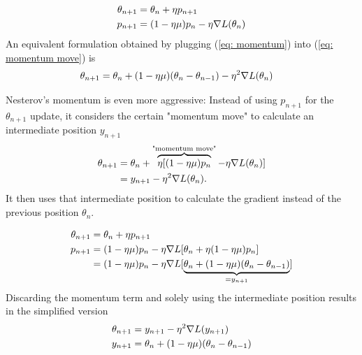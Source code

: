 \begin{definition}
	\begin{subequations}
	\begin{align}
		\theta_{n+1} &= \theta_n + \eta p_{n+1} \label{eq: momentum move}\\
		p_{n+1} &= (1-\eta\mu)p_n - \eta\nabla L(\theta_n)
		\label{eq: momentum}
	\end{align}
	\end{subequations}
	An equivalent formulation obtained by plugging (\ref{eq: momentum}) into
	(\ref{eq: momentum move}) is
	\begin{align}
		\theta_{n+1}
		&= \theta_n + (1-\eta\mu)(\theta_n - \theta_{n-1}) - \eta^2\nabla L(\theta_n)
	\end{align}
\end{definition}
%
Nesterov's momentum is even more aggressive: Instead of using \(p_{n+1}\) for
the \(\theta_{n+1}\) update, it considers the certain "momentum move"
to calculate an intermediate position \(y_{n+1}\)
%
\begin{align*}
	\theta_{n+1}
	&= \theta_n + \overbrace{\eta [(1-\eta\mu)p_n}^{\text{"momentum move"}}
	- \eta\nabla L(\theta_n)] \\
	&= y_{n+1} - \eta^2 \nabla L(\theta_n).
\end{align*}
%
It then uses that intermediate position to calculate the gradient instead of the
previous position \(\theta_n\).
\begin{definition}
	\begin{subequations}
	\begin{align}
		\theta_{n+1} &= \theta_n + \eta p_{n+1} \label{eq: nesterov momentum move}\\
		p_{n+1}
		&= (1-\eta\mu)p_n
		- \eta\nabla L[\theta_n + \eta(1-\eta\mu)p_n]
		\label{eq: nesterov momentum}
		\\ \nonumber
		&= (1-\eta\mu)p_n
		- \eta\nabla L[\underbrace{
			\theta_n + (1-\eta\mu)(\theta_n - \theta_{n-1})
		}_{= y_{n+1}}]
	\end{align}
	\end{subequations}
	Discarding the momentum term and solely using the intermediate position
	results in the simplified version
	\begin{subequations} \label{eq: nesterov intermediate position version}
	\begin{align}
		\theta_{n+1} &= y_{n+1} - \eta^2 \nabla L(y_{n+1})\\
		y_{n+1}&= \theta_n + (1-\eta\mu)(\theta_n - \theta_{n-1})
	\end{align}
	\end{subequations}
\end{definition}
